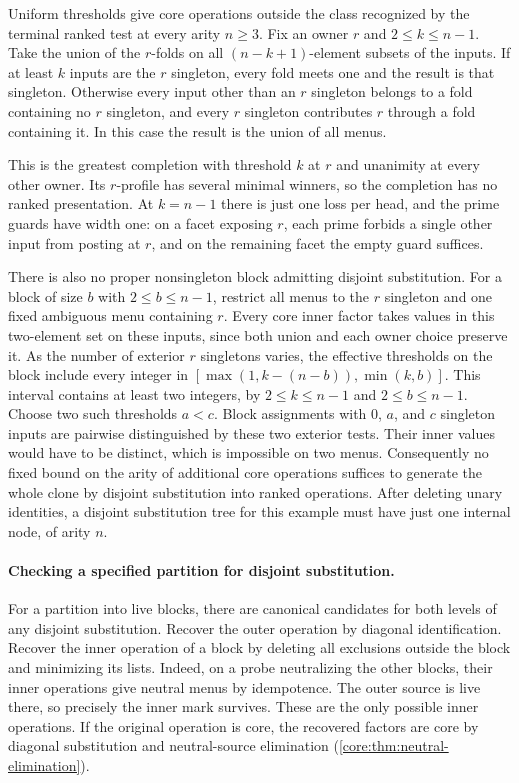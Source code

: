 Uniform thresholds give core operations outside the class recognized
by the terminal ranked test at every
arity $n\ge3$. Fix an owner $r$ and $2\le k\le n-1$.
Take the union of the $r$-folds on all $(n-k+1)$-element
subsets of the inputs. If at least $k$ inputs are the $r$ singleton,
every fold meets one and the result is that singleton. Otherwise
every input other than an $r$ singleton belongs to a fold containing
no $r$ singleton, and every $r$ singleton contributes $r$ through a
fold containing it. In this case the result is the union of all menus.

This is the greatest completion with threshold $k$ at $r$ and
unanimity at every other owner. Its $r$-profile has several minimal
winners, so the completion has no ranked presentation.
At $k=n-1$ there is just one loss
per head, and the prime guards have width one: on a facet exposing
$r$, each prime forbids a single other input from posting at $r$,
and on the remaining facet the empty guard suffices.

There is also no proper nonsingleton block admitting disjoint
substitution. For a block of size $b$ with $2\le b\le n-1$,
restrict all menus to the $r$ singleton and one fixed ambiguous
menu containing $r$. Every core inner factor takes values in this
two-element set on these inputs, since both union and each owner
choice preserve it. As the number of exterior $r$ singletons varies,
the effective thresholds on the block include every integer in
$[\max(1,k-(n-b)),\min(k,b)]$. This interval contains at least two
integers, by $2\le k\le n-1$ and $2\le b\le n-1$.
Choose two such thresholds $a<c$. Block assignments with $0$, $a$,
and $c$ singleton inputs are pairwise distinguished by these two
exterior tests. Their inner values would have to be distinct, which
is impossible on two menus.
Consequently no fixed bound on the arity of additional core operations
suffices to generate the whole clone by disjoint substitution into
ranked operations. After deleting unary identities, a disjoint
substitution tree for this example must have just one internal node,
of arity $n$.

\paragraph{Checking a specified partition for disjoint substitution.}
For a partition into live blocks, there are canonical
candidates for both levels of any disjoint substitution.
Recover the outer operation by diagonal identification.
Recover the inner operation of a block by deleting all
exclusions outside the block and minimizing its lists.
Indeed, on a probe neutralizing the other blocks, their
inner operations give neutral menus by idempotence. The
outer source is live there, so precisely the inner mark
survives. These are the only possible inner operations.
If the original operation is core, the recovered factors
are core by diagonal substitution and neutral-source
elimination (\cref{core:thm:neutral-elimination}).

